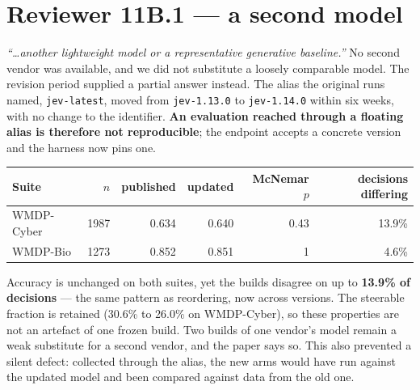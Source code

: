 \documentclass[11pt,a4paper]{article}
\newcommand{\key}[1]{\textcolor{hl}{\textbf{#1}}}
\begin{document}
\section{Reviewer 11B.1 --- a second model}
\emph{``\ldots another lightweight model or a representative generative baseline.''} No second vendor was available, and we did not substitute a loosely comparable model. The revision period supplied a partial answer instead.
The alias the original runs named, \texttt{jev-latest}, moved from \texttt{jev-1.13.0} to \texttt{jev-1.14.0} within six weeks, with no change to the identifier. \key{An evaluation reached through a floating alias is therefore not reproducible}; the endpoint accepts a concrete version and the harness now pins one.
\begin{center}\small\begin{tabular}{@{}lrrrrr@{}}
\toprule
Suite & $n$ & published & updated & McNemar $p$ & decisions differing \\
\midrule
WMDP-Cyber & 1987 & 0.634 & 0.640 & 0.43 & 13.9\% \\
WMDP-Bio & 1273 & 0.852 & 0.851 & 1 & 4.6\% \\
\bottomrule\end{tabular}\end{center}
Accuracy is unchanged on both suites, yet the builds disagree on up to \key{13.9\% of decisions} --- the same pattern as reordering, now across versions. The steerable fraction is retained (30.6\% to 26.0\% on WMDP-Cyber), so these properties are not an artefact of one frozen build. Two builds of one vendor's model remain a weak substitute for a second vendor, and the paper says so.
This also prevented a silent defect: collected through the alias, the new arms would have run against the updated model and been compared against data from the old one.
\end{document}
